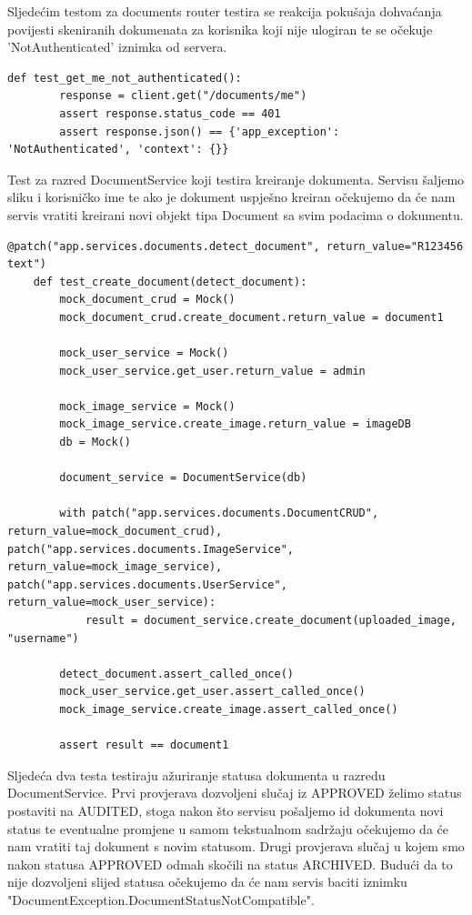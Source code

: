 			{Sljedećim testom za documents router testira se reakcija pokušaja dohvaćanja povijesti skeniranih dokumenata za korisnika koji nije ulogiran te se očekuje 'NotAuthenticated' iznimka od servera.}
			
\begin{lstlisting}[style=pythonstyle]
	def test_get_me_not_authenticated():
		response = client.get("/documents/me")
		assert response.status_code == 401
		assert response.json() == {'app_exception': 'NotAuthenticated', 'context': {}}
\end{lstlisting}

			{Test za razred DocumentService koji testira kreiranje dokumenta. Servisu šaljemo sliku i korisničko ime te ako je dokument uspješno kreiran očekujemo da će nam servis vratiti kreirani novi objekt tipa Document sa svim podacima o dokumentu.}
			
\begin{lstlisting}[style=pythonstyle]
	@patch("app.services.documents.detect_document", return_value="R123456 text")
	def test_create_document(detect_document):
		mock_document_crud = Mock()
		mock_document_crud.create_document.return_value = document1
		
		mock_user_service = Mock()
		mock_user_service.get_user.return_value = admin
		
		mock_image_service = Mock()
		mock_image_service.create_image.return_value = imageDB
		db = Mock()
		
		document_service = DocumentService(db)
		
		with patch("app.services.documents.DocumentCRUD", return_value=mock_document_crud), patch("app.services.documents.ImageService", return_value=mock_image_service), patch("app.services.documents.UserService", return_value=mock_user_service):
			result = document_service.create_document(uploaded_image, "username")
		
		detect_document.assert_called_once()
		mock_user_service.get_user.assert_called_once()
		mock_image_service.create_image.assert_called_once()
		
		assert result == document1
\end{lstlisting}

			{Sljedeća dva testa testiraju ažuriranje statusa dokumenta u razredu DocumentService. Prvi provjerava dozvoljeni slučaj iz APPROVED želimo status postaviti na AUDITED, stoga nakon što servisu pošaljemo id dokumenta novi status te eventualne promjene u samom tekstualnom sadržaju očekujemo da će nam vratiti taj dokument s novim statusom. Drugi provjerava slučaj u kojem smo nakon statusa APPROVED odmah skočili na status ARCHIVED. Budući da to nije dozvoljeni slijed statusa očekujemo da će nam servis baciti iznimku "DocumentException.DocumentStatusNotCompatible".}
			
